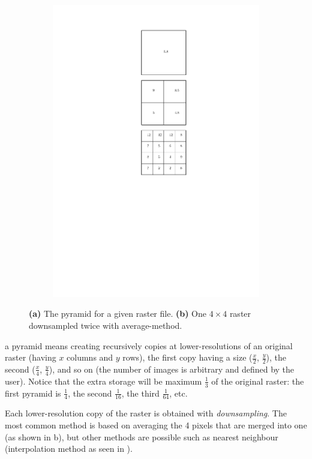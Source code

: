 \begin{figure}
\begin{subfigure}[b]{0.2\linewidth}
    \includegraphics[width=\textwidth]{figs/pyramids2.pdf}
    \caption{}
  \end{subfigure}
\caption{\textbf{(a)} The pyramid for a given raster file. \textbf{(b)} One $4\times4$ raster downsampled twice with average-method.}%
\end{figure}
a pyramid means creating recursively copies at lower-resolutions of an original raster (having $x$ columns and $y$ rows), the first copy having a size ($\frac{x}{2}$, $\frac{y}{2}$), the second ($\frac{x}{4}$, $\frac{y}{4}$), and so on (the number of images is arbitrary and defined by the user).
Notice that the extra storage will be maximum $\frac{1}{3}$ of the original raster: the first pyramid is $\frac{1}{4}$, the second $\frac{1}{16}$, the third $\frac{1}{64}$, etc.

Each lower-resolution copy of the raster is obtained with \emph{downsampling}.%
The most common method is based on averaging the 4 pixels that are merged into one (as shown in b), but other methods are possible such as nearest neighbour (interpolation method as seen in ).


